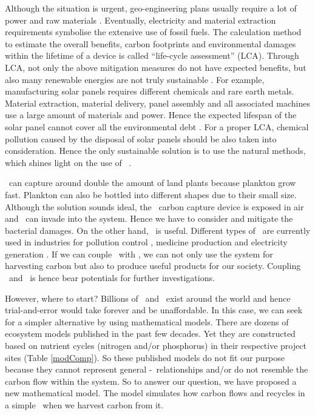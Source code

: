 \documentclass[../thesis.tex]{subfiles} %
\begin{document}
Although the situation is urgent, geo-engineering plans usually require a lot of power and raw materials \autocite{boyd2008ranking,boyd2008implications,mcclellan2012cost}.  Eventually, electricity and material extraction requirements symbolise the extensive use of fossil fuels.  The calculation method to estimate the overall benefits, carbon footprints and environmental damages within the lifetime of a device is called ``life-cycle assessment” (LCA).  Through LCA, not only the above mitigation measures do not have expected benefits, but also many renewable energies are not truly sustainable \autocite{abdussalam2020green}.  For example, manufacturing solar panels requires different chemicals and rare earth metals.  Material extraction, material delivery, panel assembly and all associated machines use a large amount of materials and power.  Hence the expected lifespan of the solar panel cannot cover all the environmental debt \autocite{martinopoulos2020rooftop}.  For a proper LCA, chemical pollution caused by the disposal of solar panels should be also taken into consideration.  Hence the only sustainable solution is to use the natural methods, which shines light on the use of \phy\ \autocite{farrelly2013carbon}.

\Phy\ can capture around double the amount of land plants \autocite{SCHLESINGER2013341} because plankton grow fast.  Plankton can also be bottled into different shapes \autocite{evanson_2019} due to their small size.  Although the solution sounds ideal, the \phy\ carbon capture device is exposed in air and \bac\ can invade into the system.  Hence we have to consider and mitigate the bacterial damages.  On the other hand, \bac\ is useful.  Different types of \bac\ are currently used in industries for pollution control \autocite{dash2013marine,naik2013lead}, medicine production \autocite{huang2012industrial} and electricity generation \autocite{songera2012electricity}.  If we can couple \phy\ with \bac, we can not only use the system for harvesting carbon but also to produce useful products for our society.  Coupling \phy\ and \bac\ is hence bear potentials for further investigations.

However, where to start?  Billions of \phy\ and \bac\ exist around the world and hence trial-and-error would take forever and be unaffordable.  In this case, we can seek for a simpler alternative by using mathematical models.  There are dozens of ecosystem models published in the past few decades.  Yet they are constructed based on nutrient cycles (nitrogen and/or phosphorus) in their respective project sites (Table \ref{modComp}).  So these published models do not fit our purpose because they cannot represent general \phy-\bac\ relationships and/or do not resemble the carbon flow within the system.  So to answer our question, we have proposed a new mathematical model.  The model simulates how carbon flows and recycles in a simple \pbs\ when we harvest carbon from it.
\end{document}
